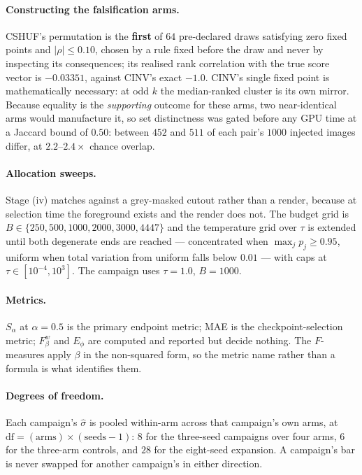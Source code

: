 \documentclass{article} %
\newcommand{\atemp}{\tau}
\begin{document}
\paragraph{Constructing the falsification arms.} CSHUF's permutation is the \textbf{first} of $64$
pre-declared draws satisfying zero fixed points and $|\rho| \leq 0.10$, chosen by a rule fixed
before the draw and never by inspecting its consequences; its realised rank correlation with the
true score vector is $-0.03351$, against CINV's exact $-1.0$. CINV's single fixed point is
mathematically necessary: at odd $k$ the median-ranked cluster is its own mirror. Because equality
is the \emph{supporting} outcome for these arms, two near-identical arms would manufacture it, so
set distinctness was gated before any GPU time at a Jaccard bound of $0.50$: between $452$ and $511$
of each pair's $1000$ injected images differ, at $2.2$--$2.4\times$ chance overlap.

\paragraph{Allocation sweeps.} Stage (iv) matches against a grey-masked cutout rather than a render,
because at selection time the foreground exists and the render does not. The budget grid is
$B \in \{250, 500, 1000, 2000, 3000, 4447\}$ and the temperature grid over $\atemp$ is extended
until both degenerate ends are reached --- concentrated when $\max_j p_j \geq 0.95$, uniform when
total variation from uniform falls below $0.01$ --- with caps at $\atemp \in [10^{-4}, 10^{3}]$. The
campaign uses $\atemp = 1.0$, $B = 1000$.

\paragraph{Metrics.} $S_\alpha$ at $\alpha = 0.5$ is the primary endpoint metric; MAE is the
checkpoint-selection metric; $F_\beta^w$ and $E_\phi$ are computed and reported but decide nothing.
The $F$-measures apply $\beta$ in the non-squared form, so the metric name rather than a formula is
what identifies them.

\paragraph{Degrees of freedom.} Each campaign's $\hat{\sigma}$ is pooled within-arm across that
campaign's own arms, at $\mathrm{df} = (\text{arms}) \times (\text{seeds} - 1)$: $8$ for the
three-seed campaigns over four arms, $6$ for the three-arm controls, and $28$ for the eight-seed
expansion. A campaign's bar is never swapped for another campaign's in either direction.
\end{document}
